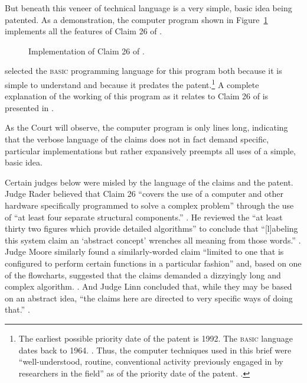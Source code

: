 \documentclass{scotus}
\begin{document}
But beneath this veneer
of technical language is a very simple, basic idea being patented. As a
demonstration, the computer program shown in Figure~\ref{code-listing}
implements all the features of Claim 26 of .

\def\floatpagefraction{.1}
\begin{figure}[p]
\inlinebox{\wholeprogram}%
\baselineskip
\caption{Implementation of Claim 26 of \protect{}.}
\label{code-listing}
\end{figure}

\Amici selected the \textsc{basic} programming language for this program both
because it is simple to understand and because it predates the
patent.\footnote{The earliest
possible priority date of the patent is 1992. The \textsc{basic} language dates
back to 1964. . Thus,
the computer techniques used in this brief were
``well-understood, routine, conventional activity
previously engaged in by researchers in the field'' as of the priority date of
the patent. .}
A complete explanation of the working of
this program as it relates to Claim 26 of  is presented in
.

As the Court will observe, the computer program is only \numlines lines long,
indicating that
the verbose language of the claims does not in fact demand specific, particular
implementations but rather expansively preempts all uses of a simple, basic
idea.

Certain
judges below were misled by the language of the
claims and the patent.
Judge Rader believed that Claim 26 ``covers the
use of a computer and
other hardware specifically programmed to solve a complex problem'' through the
use of ``at least four separate structural components.'' . He reviewed the ``at least thirty two figures
which
provide detailed algorithms'' to conclude that ``[l]abeling
this system claim an `abstract concept' wrenches all meaning from those words.''
. Judge Moore similarly found a
similarly-worded claim ``limited to one that is configured to perform certain
functions in a particular fashion'' and, based on one of the
flowcharts, suggested that the claims demanded a dizzyingly long
and complex algorithm. . And Judge Linn
concluded that, while they may be based
on an abstract idea, ``the claims here are directed to very specific ways of
doing that.''
.
\end{document}
